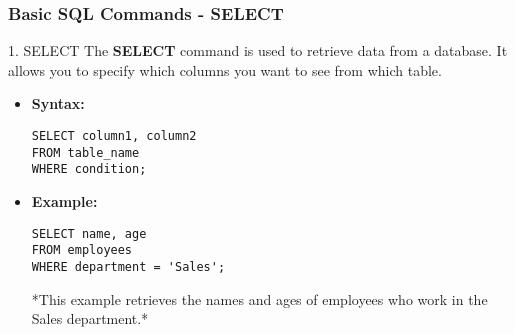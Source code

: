 \documentclass[aspectratio=169]{beamer}
\begin{document}
\begin{frame}[fragile]
    \frametitle{Basic SQL Commands - SELECT}
    \begin{block}{1. SELECT}
        The \textbf{SELECT} command is used to retrieve data from a database. It allows you to specify which columns you want to see from which table.
    \end{block}
    
    \begin{itemize}
        \item \textbf{Syntax:}
        \begin{lstlisting}
SELECT column1, column2 
FROM table_name 
WHERE condition;
        \end{lstlisting}
        
        \item \textbf{Example:}
        \begin{lstlisting}
SELECT name, age 
FROM employees 
WHERE department = 'Sales';
        \end{lstlisting}
        *This example retrieves the names and ages of employees who work in the Sales department.*
    \end{itemize}
\end{frame}
\end{document}

